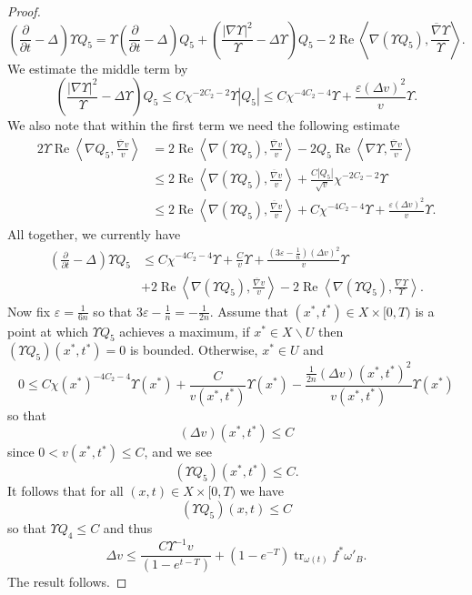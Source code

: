 \documentclass[10pt,a4paper]{amsart}
\DeclareMathOperator{\Real}{Re}
\DeclareMathOperator{\tr}{tr}
\newcommand{\e}{\varepsilon}
\newcommand{\ip}[1]{\left\langle#1\right\rangle}
\newcommand{\oo}[1]{\overline{#1}}
\newcommand{\parabolic}[1]{\left(\frac{\d}{\d t} - \Delta_{#1}\right)}
\renewcommand{\d}{\partial}
\begin{document}
\begin{proof}
\begin{equation*}
    \parabolic{} \Upsilon Q_5 = \Upsilon \parabolic{} Q_5 + \left(\frac{|\nabla \Upsilon|^2}{\Upsilon} - \Delta \Upsilon\right) Q_5 - 2 \Real \ip{\nabla(\Upsilon Q_5), \frac{\oo{\nabla} \Upsilon}{\Upsilon}}.
\end{equation*}
We estimate the middle term by
\begin{equation*}
    \left(\frac{|\nabla \Upsilon|^2}{\Upsilon} - \Delta \Upsilon\right) Q_5 \leq C\chi^{-2C_2-2}\Upsilon |Q_5| \leq C\chi^{-4C_2-4}\Upsilon + \frac{\e(\Delta v)^2}{v}\Upsilon.
\end{equation*}
We also note that within the first term we need the following estimate
\begin{align*}
    2 \Upsilon \Real \ip{\nabla Q_5, \frac{\oo{\nabla}v}{v}} &= 2 \Real \ip{\nabla (\Upsilon Q_5), \frac{\oo{\nabla}v}{v}} - 2Q_5 \Real \ip{\nabla \Upsilon, \frac{\oo{\nabla}v}{v}}\\
    &\leq 2 \Real \ip{\nabla (\Upsilon Q_5), \frac{\oo{\nabla}v}{v}} + \frac{C|Q_5|}{\sqrt{v}} \chi^{-2C_2-2} \Upsilon\\
    &\leq 2 \Real \ip{\nabla(\Upsilon Q_5), \frac{\oo{\nabla}v}{v}} + C\chi^{-4C_2-4}\Upsilon + \frac{\e(\Delta v)^2}{v}\Upsilon.
\end{align*}
All together, we currently have
\begin{align*}
    \parabolic{} \Upsilon Q_5 &\leq C\chi^{-4C_2-4}\Upsilon+ \frac{C}{v}\Upsilon + \frac{(3\e-\frac{1}{n})(\Delta v)^2}{v}\Upsilon\\
    &+ 2 \Real \ip{\nabla(\Upsilon Q_5), \frac{\oo{\nabla}v}{v}}-2 \Real \ip{\nabla(\Upsilon Q_5), \frac{\nabla \Upsilon}{\Upsilon}}.
\end{align*}
Now fix $\e = \frac{1}{6n}$ so that $3\e - \frac{1}{n} = -\frac{1}{2n}$. Assume that $(x^*,t^*) \in X \times [0,T)$ is a point at which $\Upsilon Q_5$ achieves a maximum, if $x^* \in X \backslash U$ then $(\Upsilon Q_5)(x^*,t^*) = 0$ is bounded. Otherwise, $x^* \in U$ and
\begin{equation*}
    0 \leq  C \chi(x^*)^{-4C_2-4}\Upsilon(x^*)+ \frac{C}{v(x^*,t^*)}\Upsilon(x^*) - \frac{\frac{1}{2n}(\Delta v)(x^*,t^*)^2}{v(x^*,t^*)}\Upsilon(x^*)
\end{equation*}
so that
\begin{equation*}
    (\Delta v)(x^*,t^*) \leq C
\end{equation*}
since $0 < v(x^*,t^*) \leq C$, and we see
\begin{equation*}
    (\Upsilon Q_5)(x^*,t^*) \leq C.
\end{equation*}
It follows that for all $(x,t) \in X \times [0,T)$ we have
\begin{equation*}
    (\Upsilon Q_5)(x,t) \leq C
\end{equation*}
so that $\Upsilon Q_4 \leq C$ and thus
\begin{equation*}
    \Delta v \leq \frac{C\Upsilon^{-1}v}{(1-e^{t-T})} + (1-e^{-T})\tr_{\omega(t)} f^*\omega'_B.
\end{equation*}
The result follows.
\end{proof}
\end{document}
